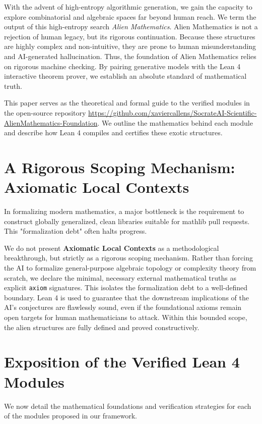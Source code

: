 \documentclass[11pt,a4paper]{article}
\begin{document}
With the advent of high-entropy algorithmic generation, we gain the capacity to explore combinatorial and algebraic spaces far beyond human reach. We term the output of this high-entropy search \textit{Alien Mathematics}. Alien Mathematics is not a rejection of human legacy, but its rigorous continuation. Because these structures are highly complex and non-intuitive, they are prone to human misunderstanding and AI-generated hallucination. Thus, the foundation of Alien Mathematics relies on rigorous machine checking. By pairing generative models with the Lean 4 interactive theorem prover, we establish an absolute standard of mathematical truth.

This paper serves as the theoretical and formal guide to the verified modules in the open-source repository \url{https://github.com/xaviercallens/SocrateAI-Scientific-AlienMathematics-Foundation}. We outline the mathematics behind each module and describe how Lean 4 compiles and certifies these exotic structures.

\section{A Rigorous Scoping Mechanism: Axiomatic Local Contexts}
In formalizing modern mathematics, a major bottleneck is the requirement to construct globally generalized, clean libraries suitable for mathlib pull requests. This "formalization debt" often halts progress. 

We do not present \textbf{Axiomatic Local Contexts} as a methodological breakthrough, but strictly as a rigorous scoping mechanism. Rather than forcing the AI to formalize general-purpose algebraic topology or complexity theory from scratch, we declare the minimal, necessary external mathematical truths as explicit \texttt{axiom} signatures. This isolates the formalization debt to a well-defined boundary. Lean 4 is used to guarantee that the downstream implications of the AI's conjectures are flawlessly sound, even if the foundational axioms remain open targets for human mathematicians to attack. Within this bounded scope, the alien structures are fully defined and proved constructively.

\section{Exposition of the Verified Lean 4 Modules}
We now detail the mathematical foundations and verification strategies for each of the modules proposed in our framework.
\end{document}

